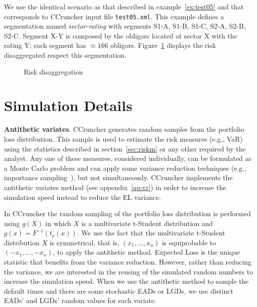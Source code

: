 \documentclass[11pt,fleqn]{book} %
\begin{document}
\begin{example}
	We use the identical scenario as that described in example~\ref{ex:test05} 
	and that corresponds to CCruncher input file \texttt{test05.xml}. This 
	example defines a segmentation named \emph{sector-rating} with segments 
	S1-A, S1-B, S1-C, S2-A, S2-B, S2-C. Segment X-Y is composed by the obligors 
	located at sector X with the rating Y; each segment has $\approx 166$ 
	obligors. Figure~\ref{fig:disaggregation} displays the risk disaggregated 
	respect this segmentation.
\end{example}

\begin{figure}[!h]
	\centering
	\caption{Risk disaggregation}
	\label{fig:disaggregation} 
\end{figure}

\section{Simulation Details}

\textbf{Antithetic variates}. CCruncher generates random samples from the 
portfolio loss distribution. This sample is used to estimate the risk measures 
(e.g., VaR) using the statistics described in section~\ref{sec:riskm} or any 
other required by the analyst. Any one of these measures, considered 
individually, can be formulated as a Monte Carlo problem and can apply some 
variance reduction techniques (e.g., importance sampling~\cite{brereton:2012}), 
but not simultaneously. CCruncher implements the antithetic variates method
(see appendix~\ref{ap:vr}) in order to increase the simulation speed instead
to reduce the EL variance.

In CCruncher the random sampling of the portfolio loss distribution is 
performed using $g(X)$ in which $X$ is a multivariate t-Student distribution 
and $g(x) = F^{-1}(t_{\nu}(x))$. We use the fact that the multivariate 
t-Student distribution $X$ is symmetrical, that is, $(x_1,\dots,x_n)$ is 
equiprobable to $(-x_1,\dots,-x_n)$, to apply the antithetic method. 
Expected Loss is the unique statistic that benefits from the variance 
reduction. However, rather than reducing the variance, we are interested 
in the reusing of the simulated random numbers to increase the simulation 
speed. When we use the antithetic method to sample the default times and 
there are some stochastic EADs or LGDs, we use distinct EADs' and LGDs' 
random values for each variate.
\end{document}
